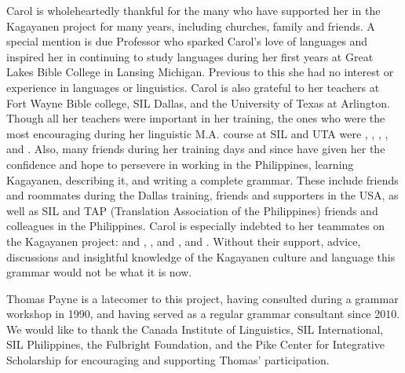 Carol is wholeheartedly thankful for the many who have supported her in the Kagayanen project for many years, including churches, family and friends. A special mention is due Professor  who sparked Carol’s love of languages and inspired her in continuing to study languages during her first years at Great Lakes Bible College in Lansing Michigan. Previous to this she had no interest or experience in languages or linguistics. Carol is also grateful to her teachers at Fort Wayne Bible college, SIL Dallas, and the University of Texas at Arlington. Though all her teachers were important in her training, the ones who were the most encouraging during her linguistic M.A. course at SIL and UTA were , , , , and . Also, many friends during her training days and since have given her the confidence and hope to persevere in working in the Philippines, learning Kagayanen, describing it, and writing a complete grammar. These include friends and roommates during the Dallas training, friends and supporters in the USA, as well as SIL and TAP (Translation Association of the Philippines) friends and colleagues in the Philippines. Carol is especially indebted to her teammates on the Kagayanen project:  and , ,  and , and . Without their support, advice, discussions and insightful knowledge of the Kagayanen culture and language this grammar would not be what it is now. 

Thomas Payne is a latecomer to this project, having consulted during a grammar workshop in 1990, and having served as a regular grammar consultant since 2010. We would like to thank the Canada Institute of Linguistics, SIL International, SIL Philippines, the Fulbright Foundation, and the Pike Center for Integrative Scholarship for encouraging and supporting Thomas’ participation.